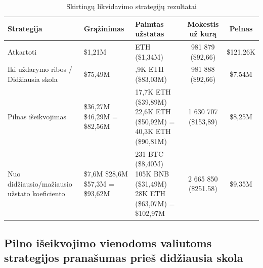 \documentclass[]{VUMIFTemplateClass}
\begin{document}
\begin{table}[h!]
  \centering
  \caption{Skirtingų likvidavimo strategijų rezultatai}
  \begin{tabular}{|>{\raggedright\arraybackslash}m{3.5cm}|>{\centering\arraybackslash}p{2cm}|>{\centering\arraybackslash}p{4cm}|c|c|}
  \hline
  \textbf{Strategija} & \textbf{Grąžinimas} & \textbf{Paimtas užstatas} & \textbf{Mokestis už kurą} & \textbf{Pelnas} \\ \hline
  Atkartoti                                    & \$1,21M   & 594 ETH (\$1,34M)     & 981 879 (\$92,66)    & \$121,26K \\ \hline
  Iki uždarymo ribos / Didžiausia skola        & \$75,49M & 36,9K ETH (\$83,03M) & 981 888 (\$92,66)    & \$7,54M   \\ \hline
  Pilnas išeikvojimas                & \makecell[c]{\$36,27M \\ \$46,29M \\ = \$82,56M}  & \makecell[c]{17,7K ETH (\$39,89M) \\ 22,6K ETH (\$50,92M) \\ = 40,3K ETH (\$90,81M)}  & 1 630 707 (\$153,89) & \$8,25M   \\ \hline
  Nuo didžiausio/mažiausio užstato koeficiento & \makecell[c]{\$7,6M \\ \$28,6M \\ \$57,3M \\ = \$93,62M}  &  \makecell[c]{231 BTC (\$8,40M) \\ 105K BNB (\$31,49M) \\ 28K ETH (\$63,07M) \\ = \$102,97M}    & 2 665 850 (\$251.58)   & \$9,35M   \\ \hline
  \end{tabular}
  \label{liquidation_example_comp}
  \end{table}

\subsection{Pilno išeikvojimo vienodoms valiutoms strategijos pranašumas prieš didžiausia skola}
\label{sec:pilnas_iseikvojimas_vienodoms_valiutoms_tyrimas}
\end{document}
